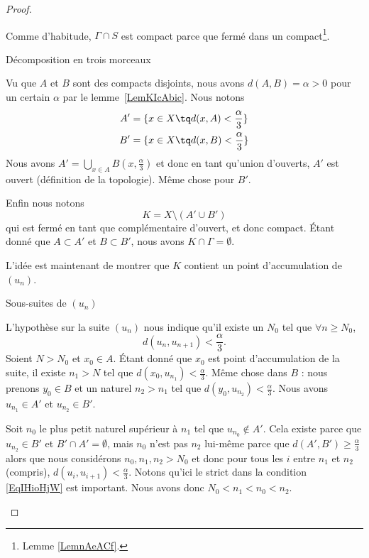 \begin{proof}
\begin{subproof}
        Comme d'habitude, \( \Gamma\cap S\) est compact parce que fermé dans un compact\footnote{Lemme \ref{LemnAeACf}.}.

    \item[Décomposition en trois morceaux]

        Vu que \( A\) et \( B\) sont des compacts disjoints, nous avons \( d(A,B)=\alpha>0\) pour un certain \( \alpha\) par le lemme~\ref{LemKIcAbic}. Nous notons
        \begin{subequations}
            \begin{align}
                A'&=\{x\in X\tq d(x,A)<\frac{ \alpha }{ 3 }\}\\
                B'&=\{x\in X\tq d(x,B)<\frac{ \alpha }{ 3 }\}
            \end{align}
        \end{subequations}
        Nous avons \( A'=\bigcup_{x\in A}B(x,\frac{ \alpha }{ 3 })\) et donc en tant qu'union d'ouverts, \( A'\) est ouvert (définition de la topologie). Même chose pour \( B'\).

        Enfin nous notons
        \begin{equation}
            K=X\setminus(A'\cup B')
        \end{equation}
        qui est fermé en tant que complémentaire d'ouvert, et donc compact. Étant donné que \( A\subset A'\) et \( B\subset B' \), nous avons \( K\cap \Gamma=\emptyset\).

        L'idée est maintenant de montrer que \( K\) contient un point d'accumulation de \( (u_n)\).

    \item[Sous-suites de \( (u_n)\)]

        L'hypothèse sur la suite \( (u_n)\) nous indique qu'il existe un \( N_0\) tel que \( \forall n\geq N_0\),
        \begin{equation}    \label{EqIHioHjW}
            d(u_{n},u_{n+1})<\frac{ \alpha }{ 3 }.
        \end{equation}
        Soient \( N>N_0 \) et \( x_0\in A\). Étant donné que \( x_0\) est point d'accumulation de la suite, il existe \( n_1>N\) tel que \( d(x_0,u_{n_1})<\frac{ \alpha }{ 3 }\). Même chose dans \( B\) : nous prenons \( y_0\in B\) et un naturel \( n_2>n_1\) tel que \( d(y_0,u_{n_2})<\frac{ \alpha }{ 3 }\). Nous avons \( u_{n_1}\in A'\) et \( u_{n_2}\in B'\).

        Soit \( n_0\) le plus petit naturel supérieur à \( n_1\) tel que \( u_{n_0}\notin A'\). Cela existe parce que \( u_{n_2}\in B'\) et \( B'\cap A'=\emptyset\), mais \( n_0\) n'est pas \( n_2\) lui-même parce que \( d(A',B')\geq \frac{ \alpha }{ 3 }\) alors que nous considérons \( n_0,n_1,n_2>N_0\) et donc pour tous les \( i\) entre \( n_1\) et \( n_2\) (compris), \( d(u_i,u_{i+1})<\frac{ \alpha }{ 3 }\). Notons qu'ici le strict dans la condition \eqref{EqIHioHjW} est important. Nous avons donc \(N_0<n_1<n_0<n_2\).


\end{subproof}
\end{proof}
